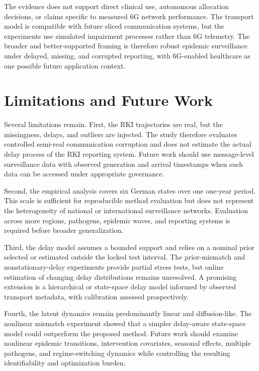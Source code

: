 The evidence does not support direct clinical use, autonomous allocation decisions, or claims specific to measured 6G network performance. The transport model is compatible with future sliced communication systems, but the experiments use simulated impairment processes rather than 6G telemetry. The broader and better-supported framing is therefore robust epidemic surveillance under delayed, missing, and corrupted reporting, with 6G-enabled healthcare as one possible future application context.

\section{Limitations and Future Work}
\label{sec:limitations_future}

Several limitations remain. First, the RKI trajectories are real, but the missingness, delays, and outliers are injected. The study therefore evaluates controlled semi-real communication corruption and does not estimate the actual delay process of the RKI reporting system. Future work should use message-level surveillance data with observed generation and arrival timestamps when such data can be accessed under appropriate governance.

Second, the empirical analysis covers six German states over one one-year period. This scale is sufficient for reproducible method evaluation but does not represent the heterogeneity of national or international surveillance networks. Evaluation across more regions, pathogens, epidemic waves, and reporting systems is required before broader generalization.

Third, the delay model assumes a bounded support and relies on a nominal prior selected or estimated outside the locked test interval. The prior-mismatch and nonstationary-delay experiments provide partial stress tests, but online estimation of changing delay distributions remains unresolved. A promising extension is a hierarchical or state-space delay model informed by observed transport metadata, with calibration assessed prospectively.

Fourth, the latent dynamics remain predominantly linear and diffusion-like. The nonlinear mismatch experiment showed that a simpler delay-aware state-space model could outperform the proposed method. Future work should examine nonlinear epidemic transitions, intervention covariates, seasonal effects, multiple pathogens, and regime-switching dynamics while controlling the resulting identifiability and optimization burden.

